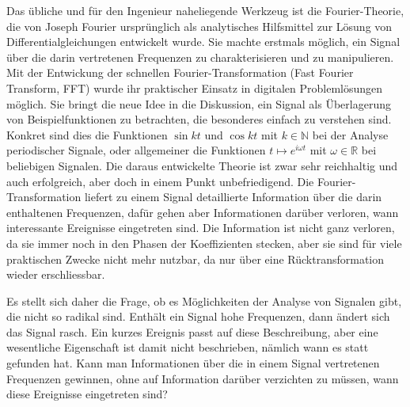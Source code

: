 Das übliche und für den Ingenieur naheliegende Werkzeug ist die 
Fourier-Theorie, die von Joseph Fourier ursprünglich als analytisches
%
%
Hilfsmittel zur Lösung von Differentialgleichungen entwickelt wurde.
Sie machte erstmals möglich, ein Signal über die darin vertretenen
Frequenzen zu charakterisieren und zu manipulieren.
Mit der Entwickung der schnellen Fourier-Transformation
(Fast Fourier Transform, FFT) wurde ihr praktischer Einsatz in digitalen
Problemlösungen möglich.
%
%
Sie bringt die neue Idee in die Diskussion, ein Signal als Überlagerung
von Beispielfunktionen zu betrachten, die besonderes einfach zu
verstehen sind.
Konkret sind dies die Funktionen $\sin kt$ und $\cos kt$ mit
$k\in\mathbb N$ bei der Analyse periodischer Signale,
oder allgemeiner die Funktionen $t\mapsto e^{i\omega t}$ mit
$\omega\in\mathbb R$ bei beliebigen Signalen.
Die daraus entwickelte Theorie ist zwar sehr reichhaltig und auch erfolgreich,
aber doch in einem Punkt unbefriedigend.
Die Fourier-Transformation liefert zu einem Signal detaillierte Information
über die darin enthaltenen Frequenzen, dafür gehen aber Informationen
darüber verloren, wann interessante Ereignisse eingetreten sind.
Die Information ist nicht ganz verloren, da sie immer noch in den Phasen
der Koeffizienten stecken, aber sie sind für viele praktischen Zwecke 
nicht mehr nutzbar, da nur über eine Rücktransformation wieder erschliessbar.

Es stellt sich daher die Frage, ob es Möglichkeiten der Analyse von Signalen
gibt, die nicht so radikal sind.
Enthält ein Signal hohe Frequenzen, dann ändert sich das Signal rasch.
Ein kurzes Ereignis passt auf diese Beschreibung, aber eine wesentliche
Eigenschaft ist damit nicht beschrieben, nämlich wann es statt gefunden hat.
Kann man Informationen über die in einem Signal vertretenen Frequenzen gewinnen,
ohne auf Information darüber verzichten zu müssen, wann diese Ereignisse
eingetreten sind?

